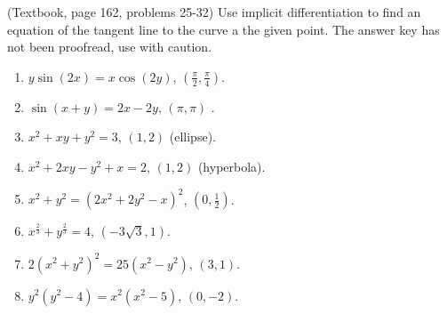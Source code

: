 (Textbook, page 162, problems 25-32) Use implicit differentiation to find an equation of the tangent line to the curve a the given point. The answer key has not been proofread, use with caution.
\begin{multicols}{3}
\begin{enumerate}
\item $y\sin (2x)=x\cos (2y) $, $\left(\frac{\pi}{2}, \frac{\pi}{4}\right)$. 
\item $ \sin (x+y)=2x-2y$, $(\pi,\pi)$ . 
\item $x^2+x y+y^2=3 $, $(1,2)$ (ellipse). 
\item $x^2+2x y-y^2+x=2 $, $(1,2)$ (hyperbola). 
\item $x^2+y^2=(2x^2+2y^2-x)^2 $, $(0,\frac{1}{2})$. 
\item $x^{\frac{2}{3}}+y^{\frac{2}{3}}=4$, $(-3\sqrt{3},1)$. 
\item $2(x^2+y^2)^2 =25(x^2-y^2)$, $(3,1)$. 
\item $y^2(y^2-4)=x^2(x^2-5) $, $(0,-2)$. 
\end{enumerate}
\end{multicols}

